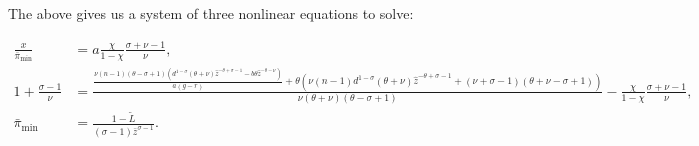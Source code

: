 \documentclass[11pt]{article}
\begin{document}
The above gives us a system of three nonlinear equations to solve:

		\begin{align}
		\frac{x}{\bar{\pi}_{\min}} &=  a \frac{\chi}{1-\chi}\frac{\sigma + \nu - 1}{\nu} , \\
		1 + \frac{\sigma - 1}{\nu} &= {\scriptstyle \frac{\frac{\nu  (n-1) (\theta -\sigma +1) \left(d^{1-\sigma } (\theta +\nu ) \hat{z}^{-\theta +\sigma -1}-b \theta  \hat{z}^{-\theta -\nu }\right)}{a (g-r)}+\theta  \left(\nu  (n-1) d^{1-\sigma } (\theta +\nu ) \hat{z}^{-\theta +\sigma -1}+(\nu +\sigma -1) (\theta +\nu -\sigma +1)\right)}{\nu  (\theta +\nu ) (\theta -\sigma +1)} -  \frac{\chi}{1-\chi}\frac{\sigma + \nu - 1}{\nu}} , \\
		\bar{\pi}_{\min} &= \tfrac{1 - \tilde{L}}{(\sigma - 1) \bar{z}^{\sigma - 1}}.
		\end{align}
\end{document}
